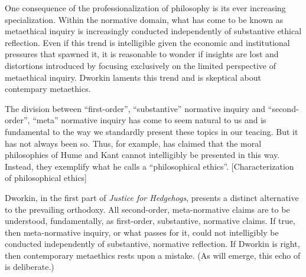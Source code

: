\documentclass[12pt]{article}
\title{\mytitle} %
\author{\myauthor}
\date{} %
\begin{document}
\maketitle


\setlength{\parindent}{1em}


\noindent One consequence of the professionalization of philosophy is its ever increasing specialization. Within the normative domain, what has come to be known as metaethical inquiry is increasingly conducted independently of substantive ethical reflection. Even if this trend is intelligible given the economic and institutional pressures that spawned it, it is reasonable to wonder if insights are lost and distortions introduced by focusing exclusively on the limited perspective of metaethical inquiry. Dworkin laments this trend and is skeptical about contempary metaethics.

The division between ``first-order'', ``substantive'' normative inquiry and ``second-order'', ``meta'' normative inquiry has come to seem natural to us and is fundamental to the way we standardly present these topics in our teacing. But it has not always been so. Thus, for example, \citet{Rawls:2000uq} has claimed that the moral philosophies of Hume and Kant cannot intelligibly be presented in this way. Instead, they exemplify what he calls a ``philosophical ethics''. [Characterization of philosophical ethics] 

Dworkin, in the first part of \emph{Justice for Hedgehogs}, presents a distinct alternative to the prevailing orthodoxy. All second-order, meta-normative claims are to be understood, fundamentally, as first-order, substantive, normative claims. If true, then meta-normative inquiry, or what passes for it, could not intelligibly be conducted independently of substantive, normative reflection. If Dworkin is right, then contemporary metaethics rests upon a mistake. (As will emerge, this echo of \citealt{Prichard:1912zm} is deliberate.)
\end{document}
